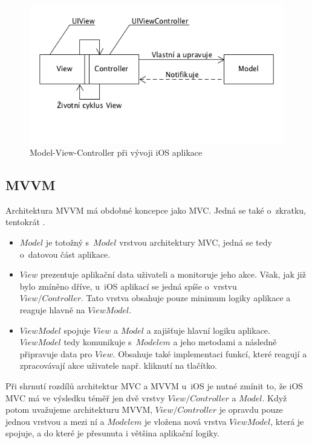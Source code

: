 \documentclass[thesis=M,czech]{FITthesis}[2012/06/26]
\begin{document}
\begin{figure}[h]\centering
 \includegraphics[width=0.99\textwidth]{./pictures/architektury/appleMVC}
 \caption[Model-View-Controller při vývoji iOS aplikace]{Model-View-Controller při vývoji iOS aplikace}\label{fig:mvc-apple}
\end{figure}

\subsection{MVVM}
Architektura MVVM má obdobné koncepce jako MVC. Jedná se také o~zkratku, tentokrát . \cite{MVVMMicrosoft}
\begin{itemize}
\item $Model$ je totožný s~$Model$ vrstvou architektury MVC, jedná se tedy o~datovou část aplikace.
\item $View$ prezentuje aplikační data uživateli a monitoruje jeho akce. Však, jak již bylo zmíněno dříve, u~iOS aplikací se jedná spíše o~vrstvu\\ $View/Controller$. Tato vrstva obsahuje pouze minimum logiky aplikace a reaguje hlavně na $ViewModel$.  \cite{Morrison}
\item $ViewModel$ spojuje $View$ a $Model$ a zajišťuje hlavní logiku aplikace. $ViewModel$ tedy komunikuje s~$Modelem$ a jeho metodami a následně připravuje data pro $View$. Obsahuje také implementaci funkcí, které reagují a zpracovávají akce uživatele např. kliknutí na tlačítko. \cite{MVVMMicrosoft}
\end{itemize}

Při shrnutí rozdílů architektur MVC a MVVM u~iOS je nutné zmínit to, že iOS MVC má ve výsledku téměř jen dvě vrstvy $View/Controller$ a $Model$. Když potom uvažujeme architekturu MVVM, $View/Controller$  je opravdu pouze jednou vrstvou a mezi ní a $Modelem$ je vložena nová vrstva $ViewModel$, která je spojuje, a do které je přesunuta i většina aplikační logiky.
\end{document}

